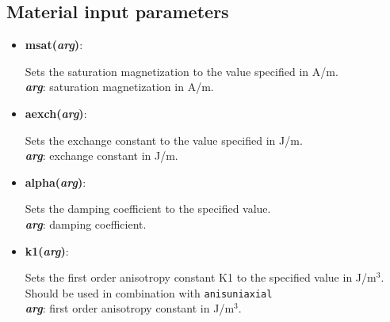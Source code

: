 \subsection{Material input parameters}

\begin{itemize}
 \item {\textbf{msat(\textit{arg})}:
				\flushright\parbox{0.9 \textwidth}{\vspace{-0.25cm} 
				Sets the saturation magnetization to the value specified in A/m.\\
				\textbf{\textit{arg}}: saturation magnetization in A/m.
				}\flushleft}
 
 \item {\vspace{-0.4cm}\textbf{aexch(\textit{arg})}:
				\flushright\parbox{0.9 \textwidth}{\vspace{-0.25cm} 
				Sets the exchange constant to the value specified in J/m.\\
				\textbf{\textit{arg}}: exchange constant in J/m.
				}\flushleft}

 \item {\vspace{-0.4cm}\textbf{alpha(\textit{arg})}:
				\flushright\parbox{0.9 \textwidth}{\vspace{-0.25cm} 
				Sets the damping coefficient to the specified value.\\
				\textbf{\textit{arg}}: damping coefficient.
				}\flushleft}

 \item {\vspace{-0.4cm}\textbf{k1(\textit{arg})}:
				\flushright\parbox{0.9 \textwidth}{\vspace{-0.25cm} 
				Sets the first order anisotropy constant K1 to the specified value in J/m$^3$.  Should be used in combination with \texttt{anisuniaxial}\\
				\textbf{\textit{arg}}: first order anisotropy constant in J/m$^3$.
				}\flushleft}



\end{itemize}
